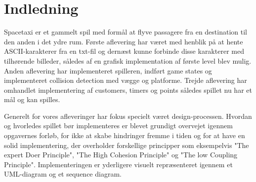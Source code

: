 

\section{Indledning}

Spacetaxi er et gammelt spil med formål at flyve passagere fra en destination til den anden i det ydre rum. Første aflevering har været med henblik på at hente ASCII-karakterer fra en txt-fil
og dernæst kunne forbinde disse karakterer med tilhørende billeder, således af en grafisk implementation af første level blev mulig. Anden aflevering har implementeret spilleren, indført game states og implementeret collision detection med vægge og platforme. Trejde aflevering har omhandlet implementering af customers, timers og points således spillet nu har et mål og kan spilles.

Generelt for vores afleveringer har fokus specielt været design-processen. Hvordan og hvorledes spillet bør implementeres er blevet grundigt overvejet igennem opgavernes forløb, for ikke at skabe hindringer fremme i tiden og for at have en solid implementering, der overholder forskellige principper som eksempelvis "The expert Doer Principle", "The High Cohesion Principle" og "The low Coupling Principle".
Implementeringen er yderligere visuelt repræsenteret igennem et UML-diagram og et sequence diagram.


